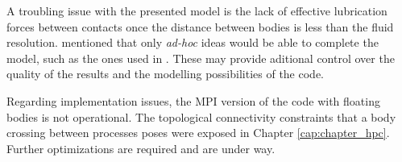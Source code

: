 A troubling issue with the presented model is the lack of effective lubrication forces between contacts once the distance between bodies is less than the fluid resolution. \cite{Potapov-2001} mentioned that only \textit{ad-hoc} ideas would be able to complete the model, such as the ones used in \cite{Kempe-2012}. These may provide aditional control over the quality of the results and the modelling possibilities of the code.

Regarding implementation issues, the MPI version of the code with floating bodies is not operational. The topological connectivity constraints that a body crossing between processes poses were exposed in Chapter \ref{cap:chapter_hpc}. Further optimizations are required and are under way.

\cleardoublepage